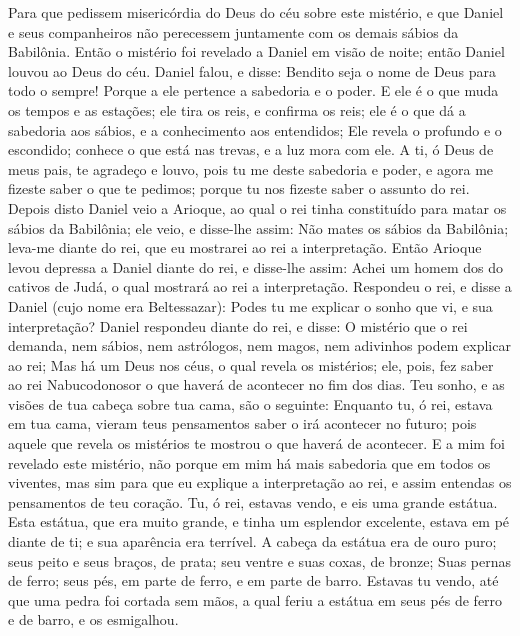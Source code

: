 {Para que pedissem misericórdia do Deus do céu sobre este mistério, e que Daniel e seus companheiros não perecessem juntamente com os demais sábios da Babilônia.
Então o mistério foi revelado a Daniel em visão de noite; então Daniel louvou ao Deus do céu.
Daniel falou, e disse: Bendito seja o nome de Deus para todo o sempre! Porque a ele pertence a sabedoria e o poder.
E ele é o que muda os tempos e as estações; ele tira os reis, e confirma os reis; ele é o que dá a sabedoria aos sábios, e a conhecimento aos entendidos;
Ele revela o profundo e o escondido; conhece o que está nas trevas, e a luz mora com ele.
A ti, ó Deus de meus pais, te agradeço e louvo, pois tu me deste sabedoria e poder, e agora me fizeste saber o que te pedimos; porque tu nos fizeste saber o assunto do rei.
Depois disto Daniel veio a Arioque, ao qual o rei tinha constituído para matar os sábios da Babilônia; ele veio, e disse-lhe assim: Não mates os sábios da Babilônia; leva-me diante do rei, que eu mostrarei ao rei a interpretação.
Então Arioque levou depressa a Daniel diante do rei, e disse-lhe assim: Achei um homem dos do cativos de Judá, o qual mostrará ao rei a interpretação.
Respondeu o rei, e disse a Daniel (cujo nome era Beltessazar): Podes tu me explicar o sonho que vi, e sua interpretação?
Daniel respondeu diante do rei, e disse: O mistério que o rei demanda, nem sábios, nem astrólogos, nem magos, nem adivinhos podem explicar ao rei;
Mas há um Deus nos céus, o qual revela os mistérios; ele, pois, fez saber ao rei Nabucodonosor o que haverá de acontecer no fim dos dias. Teu sonho, e as visões de tua cabeça sobre tua cama, são o seguinte:
Enquanto tu, ó rei, estava em tua cama, vieram teus pensamentos saber o irá acontecer no futuro; pois aquele que revela os mistérios te mostrou o que haverá de acontecer.
E a mim foi revelado este mistério, não porque em mim há mais sabedoria que em todos os viventes, mas sim para que eu explique a interpretação ao rei, e assim entendas os pensamentos de teu coração.
Tu, ó rei, estavas vendo, e eis uma grande estátua. Esta estátua, que era muito grande, e tinha um esplendor excelente, estava em pé diante de ti; e sua aparência era terrível.
A cabeça da estátua era de ouro puro; seus peito e seus braços, de prata; seu ventre e suas coxas, de bronze;
Suas pernas de ferro; seus pés, em parte de ferro, e em parte de barro.
Estavas tu vendo, até que uma pedra foi cortada sem
{} mãos, a qual feriu a estátua em seus pés de ferro e de barro, e os esmigalhou.
}
